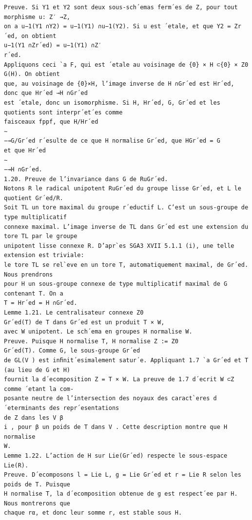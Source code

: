 \documentclass[10pt]{article}
\begin{document}
\begin{verbatim}
Preuve. Si Y1 et Y2 sont deux sous-sch´emas ferm´es de Z, pour tout morphisme u: Z′ →Z,
on a u−1(Y1 ∩Y2) = u−1(Y1) ∩u−1(Y2). Si u est ´etale, et que Y2 = Zr´ed, on obtient
u−1(Y1 ∩Zr´ed) = u−1(Y1) ∩Z′
r´ed.
Appliquons ceci `a F, qui est ´etale au voisinage de {0} × H ⊂{0} × Z0
G(H). On obtient
que, au voisinage de {0}×H, l’image inverse de H ∩Gr´ed est Hr´ed, donc que Hr´ed →H ∩Gr´ed
est ´etale, donc un isomorphisme. Si H, Hr´ed, G, Gr´ed et les quotients sont interpr´et´es comme
faisceaux fppf, que H/Hr´ed
∼
−→G/Gr´ed r´esulte de ce que H normalise Gr´ed, que HGr´ed = G
et que Hr´ed
∼
−→H ∩Gr´ed.
1.20. Preuve de l’invariance dans G de RuGr´ed.
Notons R le radical unipotent RuGr´ed du groupe lisse Gr´ed, et L le quotient Gr´ed/R.
Soit TL un tore maximal du groupe r´eductif L. C’est un sous-groupe de type multiplicatif
connexe maximal. L’image inverse de TL dans Gr´ed est une extension du tore TL par le groupe
unipotent lisse connexe R. D’apr`es SGA3 XVII 5.1.1 (i), une telle extension est triviale:
le tore TL se rel`eve en un tore T, automatiquement maximal, de Gr´ed.
Nous prendrons
pour H un sous-groupe connexe de type multiplicatif maximal de G contenant T. On a
T = Hr´ed = H ∩Gr´ed.
Lemme 1.21. Le centralisateur connexe Z0
Gr´ed(T) de T dans Gr´ed est un produit T × W,
avec W unipotent. Le sch´ema en groupes H normalise W.
Preuve. Puisque H normalise T, H normalise Z := Z0
Gr´ed(T). Comme G, le sous-groupe Gr´ed
de GL(V ) est inﬁnit´esimalement satur´e. Appliquant 1.7 `a Gr´ed et T (au lieu de G et H)
fournit la d´ecomposition Z = T × W. La preuve de 1.7 d´ecrit W ⊂Z comme ´etant la com-
posante neutre de l’intersection des noyaux des caract`eres d´eterminants des repr´esentations
de Z dans les V β
i , pour β un poids de T dans V . Cette description montre que H normalise
W.
Lemme 1.22. L’action de H sur Lie(Gr´ed) respecte le sous-espace Lie(R).
Preuve. D´ecomposons l = Lie L, g = Lie Gr´ed et r = Lie R selon les poids de T. Puisque
H normalise T, la d´ecomposition obtenue de g est respect´ee par H. Nous montrerons que
chaque rα, et donc leur somme r, est stable sous H.


\end{verbatim}
\end{document}
